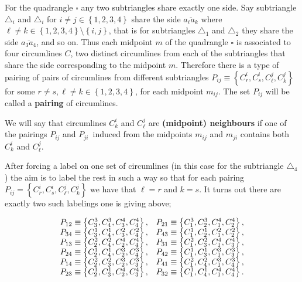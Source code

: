 \documentclass{unswthesis}
\begin{document}
For the quadrangle $\square $ any two subtriangles share exactly one side.
Say subtriangle $\triangle _{i}$ and $\triangle _{i}$ for $i\neq j\in
\left\{ 1,2,3,4\right\} $ share the side $\overline{a_{\ell }a_{k}}$ where $%
\ell \neq k\in \left\{ 1,2,3,4\right\} \setminus \left\{ i,j\right\} $, that
is for subtriangles $\triangle _{1}$ and $\triangle _{2}$ they share the
side $\overline{a_{3}a_{4}}$, and so on. Thus each midpoint $m$ of the
quadrangle $\square $ is associated to four circumlines $C$, two distinct
circumlines from each of the subtriangles that share the side corresponding
to the midpoint $m$. Therefore there is a type of pairing of pairs of
circumlines from different subtriangles $P_{ij}\equiv \left\{
C_{r}^{i},C_{s}^{i},C_{\ell }^{j},C_{k}^{j}\right\} $ for some $r\neq s,\ell
\neq k\in \left\{ 1,2,3,4\right\} $, for each midpoint $m_{ij}$. The set $%
P_{ij}$ will be called a \textbf{pairing} of circumlines.

We will say that circumlines $C_{k}^{i}$ and $C_{\ell }^{j}$ are \textbf{%
(midpoint) neighbours} if one of the pairings $P_{ij}$ and $P_{ji}$\ induced
from the midpoints $m_{ij}$ and $m_{ji}$ contains both $C_{k}^{i}$ and $%
C_{\ell }^{j}$.

\bigskip

After forcing a label on one set of circumlines (in this case for the
subtriangle $\triangle _{4}$) the aim is to label the rest in such a way so
that for each pairing $P_{ij}=\left\{ C_{r}^{i},C_{s}^{i},C_{\ell
}^{j},C_{k}^{j}\right\} $ we have that $\ell =r$ and $k=s$. It turns out
there are exactly two such labelings one is giving above;

\begin{equation*}
\begin{array}{cc}
P_{12}\equiv \left\{ C_{3}^{3},C_{4}^{3},C_{3}^{4},C_{4}^{4}\right\} , & 
P_{21}\equiv \left\{ C_{1}^{3},C_{2}^{3},C_{1}^{4},C_{2}^{4}\right\} , \\ 
P_{34}\equiv \left\{ C_{3}^{1},C_{4}^{1},C_{3}^{2},C_{4}^{2}\right\} , & 
P_{43}\equiv \left\{ C_{1}^{1},C_{2}^{1},C_{1}^{2},C_{2}^{2}\right\} , \\ 
P_{13}\equiv \left\{ C_{2}^{2},C_{4}^{2},C_{2}^{4},C_{4}^{4}\right\} , & 
P_{31}\equiv \left\{ C_{1}^{2},C_{3}^{2},C_{1}^{4},C_{3}^{4}\right\} , \\ 
P_{24}\equiv \left\{ C_{2}^{1},C_{4}^{1},C_{2}^{3},C_{4}^{3}\right\} , & 
P_{42}\equiv \left\{ C_{1}^{1},C_{3}^{1},C_{1}^{3},C_{3}^{3}\right\} , \\ 
P_{14}\equiv \left\{ C_{2}^{2},C_{3}^{2},C_{2}^{3},C_{3}^{3}\right\} , & 
P_{41}\equiv \left\{ C_{1}^{2},C_{4}^{2},C_{1}^{3},C_{4}^{3}\right\} , \\ 
P_{23}\equiv \left\{ C_{2}^{1},C_{3}^{1},C_{2}^{4},C_{3}^{4}\right\} , & 
P_{32}\equiv \left\{ C_{1}^{1},C_{4}^{1},C_{1}^{4},C_{4}^{4}\right\} .%
\end{array}%
\newline
\end{equation*}
\end{document}
